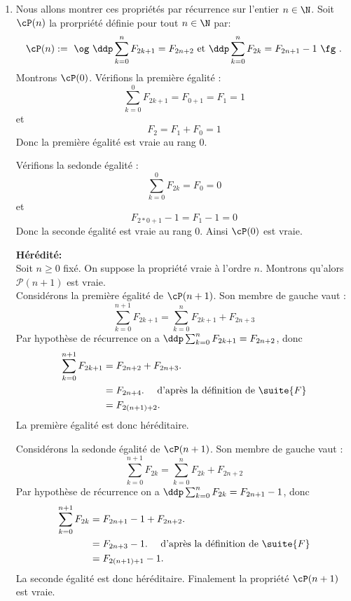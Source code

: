 \documentclass[a4paper, 11pt,reqno]{article}
\begin{document}
\begin{correction}
\begin{enumerate}
\item Nous allons montrer ces propriétés par récurrence sur l'entier $n\in \N$. 
Soit $\cP(n)$ la prorpriété définie pour tout $n\in\N$ par:
$$\cP(n) := \text{ \og }\ddp  \sum_{k=0}^n F_{2k+1} =F_{2n+2} \text{ 
et } \ddp \sum_{k=0}^n F_{2k} =F_{2n+1}-1 \text{ \fg }.$$
Montrons  $\cP(0)$. Vérifions la première égalité : 
$$\sum_{k=0}^0 F_{2k+1} =F_{0+1}=F_1=1$$
et 
$$F_2 =F_1+F_0 =1$$
Donc la première égalité est vraie au rang $0$. 

Vérifions la sedonde égalité : 
$$\sum_{k=0}^0 F_{2k} =F_{0}=0$$
et 
$$F_{2*0+1}-1 =F_1-1=0$$
Donc la seconde égalité est vraie au rang $0$. 
Ainsi $\cP(0)$ est vraie. 


 \textbf{H\'er\'edit\'e:}\\
Soit $n\geq 0$ fix\'e. On suppose la propri\'et\'e vraie \`a l'ordre $n$. Montrons qu'alors $\mathcal{P}(n+1)$ est vraie.\\

Considérons la première égalité de $\cP(n+1)$. Son membre de gauche vaut : 
\begin{equation*}
 \sum_{k=0}^{n+1} F_{2k+1}=  \sum_{k=0}^n F_{2k+1} +F_{2n+3}
\end{equation*}
Par hypothèse de récurrence on a $ \ddp \sum_{k=0}^n F_{2k+1} = F_{2n+2}$, donc 
\begin{align*}
 \sum_{k=0}^{n+1} F_{2k+1} & =F_{2n+2}+F_{2n+3}.\\
								& = F_{2n+4}.\quad \text{ d'après la définition de $\suite{F}$}\\
								& = F_{2(n+1)+2}.\\
\end{align*}
La première égalité est donc héréditaire. 


Considérons la sedonde égalité de $\cP(n+1)$. Son membre de gauche vaut : 
\begin{equation*}
 \sum_{k=0}^{n+1} F_{2k}=  \sum_{k=0}^n F_{2k} +F_{2n+2}
\end{equation*}
Par hypothèse de récurrence on a $ \ddp \sum_{k=0}^n F_{2k} = F_{2n+1}-1$, donc 
\begin{align*}
 \sum_{k=0}^{n+1} F_{2k} & =F_{2n+1}-1+F_{2n+2}.\\
								& = F_{2n+3}-1.\quad \text{ d'après la définition de $\suite{F}$}\\
								& = F_{2(n+1)+1}-1.\\
\end{align*}
La seconde égalité est donc héréditaire. Finalement la propriété $\cP(n+1)$ est vraie. 



\end{enumerate}
\end{correction}
\end{document}
